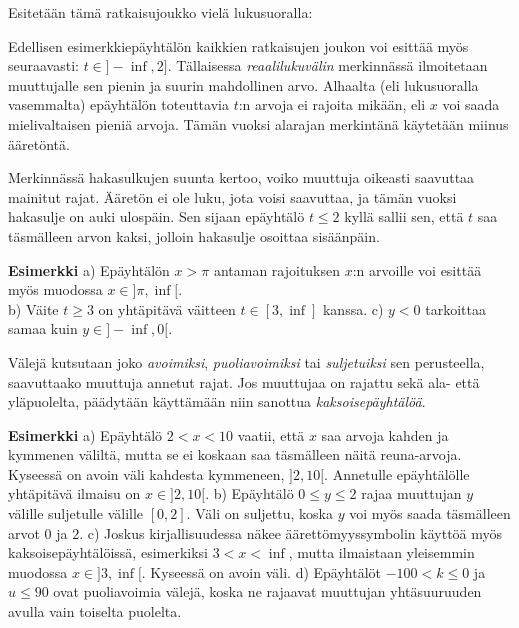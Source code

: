 Esitetään tämä ratkaisujoukko vielä lukusuoralla:

\begin{lukusuora}{-6}{10}{6}
\end{lukusuora}

Edellisen esimerkkiepäyhtälön kaikkien ratkaisujen joukon voi esittää myös seuraavasti: $t \in ]-\inf, 2]$. Tällaisessa \emph{reaalilukuvälin} merkinnässä ilmoitetaan muuttujalle sen pienin ja suurin mahdollinen arvo. Alhaalta (eli lukusuoralla vasemmalta) epäyhtälön toteuttavia $t$:n arvoja ei rajoita mikään, eli $x$ voi saada mielivaltaisen pieniä arvoja. Tämän vuoksi alarajan merkintänä käytetään miinus ääretöntä.

Merkinnässä hakasulkujen suunta kertoo, voiko muuttuja oikeasti saavuttaa mainitut rajat. Ääretön ei ole luku, jota voisi saavuttaa, ja tämän vuoksi hakasulje on auki ulospäin. Sen sijaan epäyhtälö $t \leq 2$ kyllä sallii sen, että $t$ saa täsmälleen arvon kaksi, jolloin hakasulje osoittaa sisäänpäin.

\textbf{Esimerkki}
a) Epäyhtälön $x>\pi$ antaman rajoituksen $x$:n arvoille voi esittää myös muodossa $x \in ]\pi, \inf[$. \\
b) Väite $t \geq 3$ on yhtäpitävä väitteen $t \in [3, \inf]$ kanssa.
c) $y<0$ tarkoittaa samaa kuin $y \in ]-\inf,0[$.

Välejä kutsutaan joko \emph{avoimiksi}, \emph{puoliavoimiksi} tai \emph{suljetuiksi} sen perusteella, saavuttaako muuttuja annetut rajat. Jos muuttujaa on rajattu sekä ala- että yläpuolelta, päädytään käyttämään niin sanottua \emph{kaksoisepäyhtälöä}.

\textbf{Esimerkki}
a) Epäyhtälö $2<x<10$ vaatii, että $x$ saa arvoja kahden ja kymmenen väliltä, mutta se ei koskaan saa täsmälleen näitä reuna-arvoja. Kyseessä on avoin väli kahdesta kymmeneen, $]2,10[$. Annetulle epäyhtälölle yhtäpitävä ilmaisu on $x \in ]2,10[$.
b) Epäyhtälö $0\leq y \leq 2$ rajaa muuttujan $y$ välille suljetulle välille $[0,2]$. Väli on suljettu, koska $y$ voi myös saada täsmälleen arvot $0$ ja $2$.
c) Joskus kirjallisuudessa näkee äärettömyyssymbolin käyttöä myös kaksoisepäyhtälöissä, esimerkiksi $3<x<\inf$, mutta ilmaistaan yleisemmin muodossa $x \in ]3,\inf[$. Kyseessä on avoin väli.
d) Epäyhtälöt $-100<k\leq 0$ ja $u\leq 90$ ovat puoliavoimia välejä, koska ne rajaavat muuttujan yhtäsuuruuden avulla vain toiselta puolelta.

